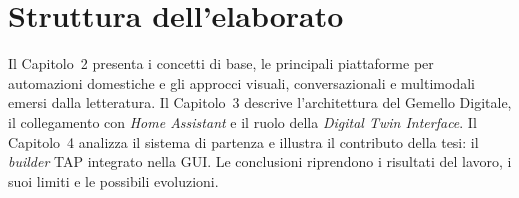 \section{Struttura dell'elaborato}
Il Capitolo~2 presenta i concetti di base, le principali piattaforme per automazioni domestiche e gli approcci visuali, conversazionali e multimodali emersi dalla letteratura. Il Capitolo~3 descrive l'architettura del Gemello Digitale, il collegamento con \textit{Home Assistant} e il ruolo della \textit{Digital Twin Interface}. Il Capitolo~4 analizza il sistema di partenza e illustra il contributo della tesi: il \textit{builder} TAP integrato nella GUI. Le conclusioni riprendono i risultati del lavoro, i suoi limiti e le possibili evoluzioni.
